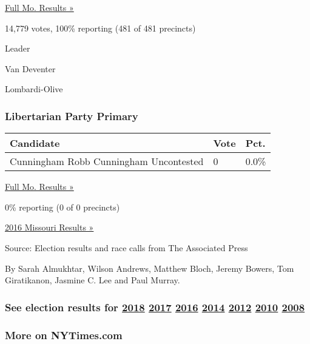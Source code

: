 \href{https://www.nytimes.com/elections/results/missouri}{Full Mo.
Results »}

14,779 votes, 100\% reporting (481 of 481 precincts)

Leader

 Van Deventer

 Lombardi-Olive

\hypertarget{libertarian-party-primary}{%
\subsubsection{Libertarian Party
Primary}\label{libertarian-party-primary}}

\begin{longtable}[]{@{}lll@{}}
\toprule
Candidate & Vote & Pct.\tabularnewline
\midrule
\endhead
 Cunningham Robb Cunningham Uncontested & 0 & 0.0\%\tabularnewline
\bottomrule
\end{longtable}

\href{https://www.nytimes.com/elections/results/missouri}{Full Mo.
Results »}

0\% reporting (0 of 0 precincts)

\href{https://www.nytimes.com/elections/results/missouri}{2016 Missouri
Results »}

Source: Election results and race calls from The Associated Press

By Sarah Almukhtar, Wilson Andrews, Matthew Bloch, Jeremy Bowers, Tom
Giratikanon, Jasmine C. Lee and Paul Murray.

\hypertarget{see-election-results-for-2018-2017-2016-2014-2012-2010-2008}{%
\subsubsection{\texorpdfstring{See election results for
\href{https://www.nytimes.com/interactive/2018/us/elections/calendar-primary-results.html}{2018}
\href{https://www.nytimes.com/interactive/2017/us/elections/election-calendar.html}{2017}
\href{https://www.nytimes.com/elections/results/president}{2016}
\href{https://www.nytimes.com/elections/2014/results/senate}{2014}
\href{https://www.nytimes.com/elections/2012/results/president.html}{2012}
\href{https://www.nytimes.com/elections/2010/results/senate.html}{2010}
\href{https://www.nytimes.com/elections/2008/results/president/map.html}{2008}}{See election results for 2018 2017 2016 2014 2012 2010 2008}}\label{see-election-results-for-2018-2017-2016-2014-2012-2010-2008}}

\hypertarget{more-on-nytimescom}{%
\subsubsection{More on NYTimes.com}\label{more-on-nytimescom}}

